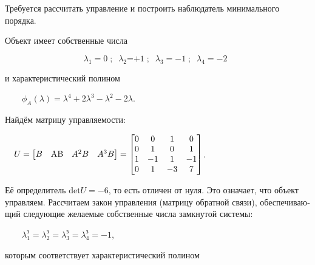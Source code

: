 \documentclass[a4paper]{article}
\newcommand\normalsubformula[1]{\text{\mathversion{normal}$#1$}}
\begin{document}
{\begin{russian}\sffamily
Требуется рассчитать управление и построить наблюдатель минимального порядка.
\end{russian}}


\bigskip


\bigskip

{\begin{russian}\sffamily
Объект имеет собственные числа
\end{russian}}

\begin{equation*}
λ_1=0\;;\;\;λ_2\text{=+}1\;;\;\;λ_3=-1\;;\;\;λ_4=-2\;\;
\end{equation*}
{\begin{russian}\sffamily
и характеристический полином
\end{russian}}

{\begin{russian}\sffamily
\ \ \ \  $ϕ_A(λ)=λ^4+2λ^3-λ^2-2λ$.
\end{russian}}

{\begin{russian}\sffamily
Найдём матрицу управляемости:
\end{russian}}

{\begin{russian}\sffamily
\ \ 
$U=\left[\begin{matrix}B&\normalsubformula{\text{AB}}&A^2B&A^3B\end{matrix}\right]=\left[\begin{matrix}0&0&1&0\\0&1&0&1\\1&-1&1&-1\\0&1&-3&7\end{matrix}\right]$.
\end{russian}}

{\begin{russian}\sffamily
Её определитель  $\text{det}U=-6$, то есть отличен от нуля. Это означает, что объект управляем. Рассчитаем закон
управления (матрицу обратной связи), обеспечивающий следующие желаемые собственные числа замкнутой системы:
\end{russian}}

{\begin{russian}\sffamily
\ \ \ \  $λ_1^з=λ_2^з=λ_3^з=λ_4^з=-1$,
\end{russian}}

{\begin{russian}\sffamily
которым соответствует характеристический полином
\end{russian}}
\end{document}
